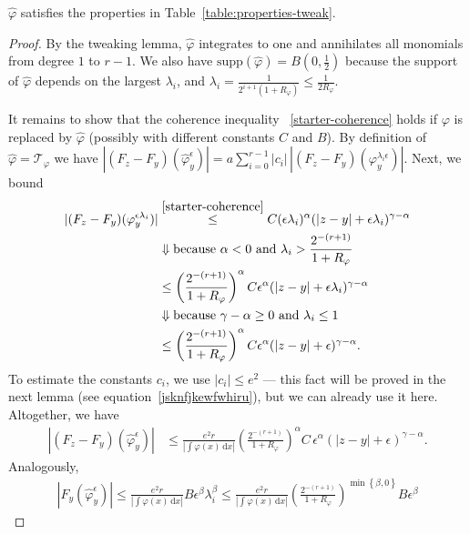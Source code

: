 \begin{lemma}\label{lemma:hat-phi-satisfies-table}
    \(\hat \varphi\) satisfies the properties in Table~\ref{table:properties-tweak}.
\end{lemma}
\begin{proof}
    By the tweaking lemma, \(\hat \varphi\) integrates to one and annihilates all monomials from degree \(1\) to \(r-1\). 
    We also have \(\mathrm{supp}(\hat \varphi) = B(0,\frac{1}{2})\) because the support of \(\hat \varphi\) depends on the largest \(\lambda_i\), and \(\lambda_i = \frac{1}{2^{i+1}(1+R_\varphi)} \leq \frac{1}{2R_\varphi}\). 
    
    It remains to show that the coherence inequality 
   ~\eqref{starter-coherence} holds if \(\varphi\) is replaced by \(\hat \varphi\) (possibly with different constants \(C\) and \(B\)). By definition of \(\hat \varphi = \mathcal{T}_\varphi\) we have \(|(F_z - F_y)(\hat \varphi^\epsilon_y)| = a\sum^{r-1}_{i=0} |c_i| \, |(F_z - F_y)(\varphi_y^{\lambda_i \epsilon})|\). Next, we bound
    \begin{align*}
        |(F_z - F_y)(\varphi_y^{ \epsilon \lambda_i})| &\overset{\eqref{starter-coherence}}{\leq}  C(\epsilon\lambda_i)^\alpha(|z-y| + \epsilon\lambda_i)^{\gamma-\alpha} \\
        &\Downarrow \text{because \(\alpha < 0\) and \(\lambda_i > \frac{2^{-(r+1)}}{1+R_\varphi}\)}\\
        &\leq  \left(\frac{2^{-(r+1)}}{1+R_\varphi}\right)^\alpha C\epsilon^\alpha(|z-y| + \epsilon\lambda_i)^{\gamma - \alpha} \\
        &\Downarrow \text{because \(\gamma - \alpha \geq 0\) and \(\lambda_i \leq 1\)}\\
        &\leq   \left(\frac{2^{-(r+1)}}{1+R_\varphi}\right)^\alpha C \epsilon^\alpha(|z-y| + \epsilon)^{\gamma - \alpha}.
    \end{align*}
    To estimate the constants \(c_i\), we use \(|c_i| \leq e^2\) --- this fact will be proved in the next lemma (see equation~\eqref{jsknfjkewfwhiru}), but we can already use it here. Altogether, we have  
    \begin{align*}
        |(F_z - F_y)(\hat \varphi^\epsilon_y)| &\leq \frac{e^2 r}{|\int \varphi(x)\, \mathrm{d}x|} \left(\frac{2^{-(r+1)}}{1+R_\varphi}\right)^\alpha C \, \epsilon^\alpha(|z-y| + \epsilon)^{\gamma - \alpha}.
    \end{align*}
    Analogously, 
    \begin{align*}
        |F_y(\hat \varphi^\epsilon_y)| \leq \frac{e^2 r}{|\int \varphi(x)\, \mathrm{d}x|} B \epsilon^\beta\lambda_i^\beta \leq  \frac{e^2 r}{|\int \varphi(x)\, \mathrm{d}x|}  \left(\frac{2^{-(r+1)}}{1+R_\varphi}\right)^{\min\left\{ \beta, 0 \right\} }B\epsilon^\beta

\end{align*}
\end{proof}
